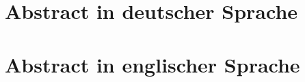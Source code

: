 \section*{Abstract in deutscher Sprache}

\acresetall{}

\newpage \section*{Abstract in englischer Sprache}

\acresetall{}
